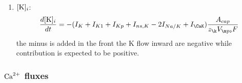 \begin{enumerate}


\item $[\ce{K}]_i$:
  \begin{equation}
    \label{eq:796}
    \frac{d[\ce{K}]_i}{dt} = -(I_K+I_{K1}+I_{Kp}+I_{ns,K} -
    2I_{Na/K}+I_\CaK) \frac{A_{cap}}{z_\k V_\myo F}
  \end{equation}
  the minus is added in the front the K flow inward are negative while
  contribution is expected to be positive.
\end{enumerate}

\subsubsection{${\text{Ca}^{2+}}$ fluxes}
\label{sec:calcium-fluxes}

